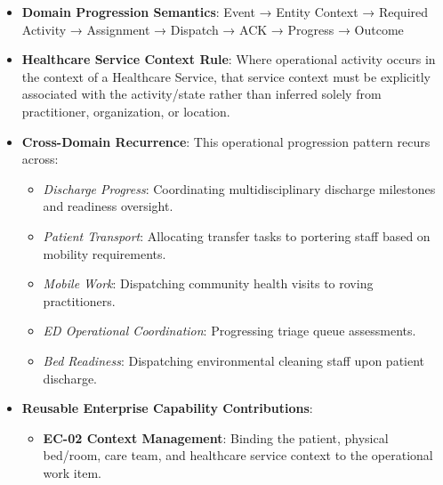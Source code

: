\begin{itemize}

\item 
\textbf{Domain Progression Semantics}: Event → Entity Context → Required Activity → Assignment → Dispatch → ACK → Progress → Outcome



\item 
\textbf{Healthcare Service Context Rule}: Where operational activity occurs in the context of a Healthcare Service, that service context must be explicitly associated with the activity/\allowbreak{}state rather than inferred solely from practitioner, organization, or location.



\item 
\textbf{Cross-Domain Recurrence}: This operational progression pattern recurs across:


\begin{itemize}

\item 
\emph{Discharge Progress}: Coordinating multidisciplinary discharge milestones and readiness oversight.



\item 
\emph{Patient Transport}: Allocating transfer tasks to portering staff based on mobility requirements.



\item 
\emph{Mobile Work}: Dispatching community health visits to roving practitioners.



\item 
\emph{ED Operational Coordination}: Progressing triage queue assessments.



\item 
\emph{Bed Readiness}: Dispatching environmental cleaning staff upon patient discharge.



\end{itemize}


\item 
\textbf{Reusable Enterprise Capability Contributions}:


\begin{itemize}

\item 
\textbf{EC-02 Context Management}: Binding the patient, physical bed/\allowbreak{}room, care team, and healthcare service context to the operational work item.




\end{itemize}
\end{itemize}
